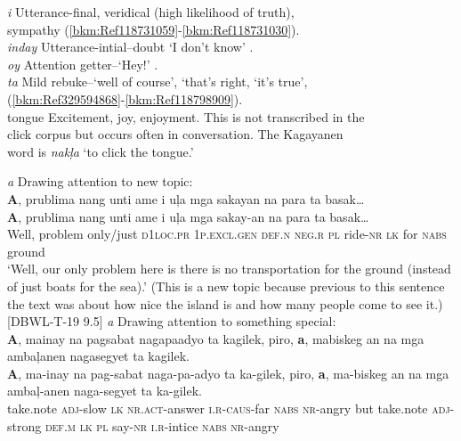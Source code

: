 \begin{tabbing}
\textit{i} \> Utterance-final, veridical (high likelihood of truth), \\
\> sympathy (\ref{bkm:Ref118731059}-\ref{bkm:Ref118731030}). \\
\textit{inday} \> Utterance-intial--doubt ‘I don’t know’ . \\
\textit{oy} \> Attention getter--‘Hey!’ . \\
\textit{ta} \> Mild rebuke--‘well of course’, ‘that’s right, ‘it’s true’, \\
\> (\ref{bkm:Ref329594868}-\ref{bkm:Ref118798909}). \\
tongue \> Excitement, joy, enjoyment. This is not transcribed in the \\
click \> corpus but occurs often in conversation. The Kagayanen \\
\> word is \textit{nakļa} ‘to  click the tongue.’
\end{tabbing}
\z 
\ea
\label{bkm:Ref118531220}\label{bkm:Ref114565664}
\textit{a} Drawing attention to new topic: \\
\textbf{A},  prublima  nang  unti  ame  i  uļa  mga  sakayan na  para  ta  basak… \\\smallskip
\gll \textbf{A},  prublima  nang  unti  ame  i  uļa  mga  sakay-an na  para  ta  basak… \\
Well,  problem  only/just  \textsc{d}1\textsc{loc.pr}  1\textsc{p.excl.gen}  \textsc{def.n}  \textsc{neg.r}  \textsc{pl}  ride-\textsc{nr}
\textsc{lk}  for  \textsc{nabs}  ground \\
\glt ‘Well, our only problem here is there is no transportation for the ground (instead of just boats for the sea).’ (This is a new topic because previous to this sentence the text was about how nice the island is and how many people come to see it.) [DBWL-T-19 9.5]
\z
\ea 
\textit{a} Drawing attention to something special: \\
\textbf{A},   mainay  na  pagsabat  nagapaadyo  ta  kagilek, piro,  \textbf{a},  mabiskeg  an  na  mga  ambaļanen  nagasegyet  ta  kagilek. \\\smallskip
\gll \textbf{A},   ma-inay  na  pag-sabat  naga-pa-adyo  ta  ka-gilek, piro,   \textbf{a},   ma-biskeg  an  na  mga  ambaļ-anen  naga-segyet  ta  ka-gilek. \\
take.note  \textsc{adj}-slow  \textsc{lk}  \textsc{nr.act}-answer  \textsc{i.r}-\textsc{caus}-far  \textsc{nabs}  \textsc{nr}-angry
but  take.note  \textsc{adj}-strong  \textsc{def.m}  \textsc{lk}  \textsc{pl}  say-\textsc{nr}   \textsc{i.r}-intice  \textsc{nabs}  \textsc{nr}-angry \\
